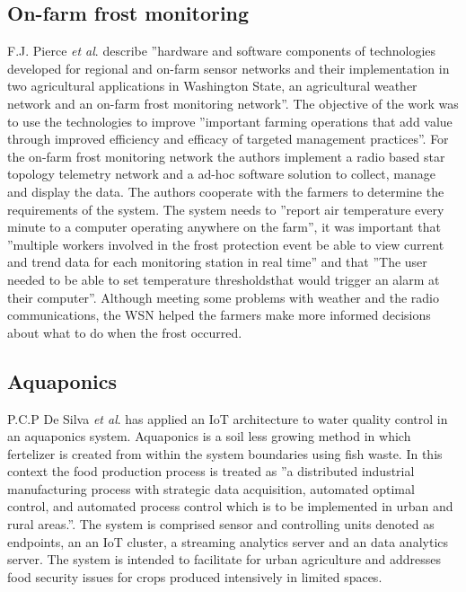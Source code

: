 \documentclass[]{uiophd}
\begin{document}
\subsection{On-farm frost monitoring}
F.J. Pierce \textit{et al}. \parencite{PIERCE200832} describe ''hardware and software components of technologies developed for regional and on-farm sensor networks and their implementation in two agricultural applications in Washington State, an agricultural weather network and an on-farm frost monitoring network''. The objective of the work was to use the technologies to improve ''important farming operations that add value through improved efficiency and efficacy of targeted management practices''\parencite{PIERCE200832}. For the on-farm frost monitoring network the authors implement a radio based star topology telemetry network and a ad-hoc software solution to collect, manage and display the data. The authors cooperate with the farmers to determine the requirements of the system. The system needs to ''report air temperature every minute to a computer operating anywhere on the farm''\parencite{PIERCE200832}, it was important that ''multiple workers involved in the frost protection event be able to view current and trend data for each monitoring station in real time''\parencite{PIERCE200832} and that ''The user needed to be able to set temperature thresholdsthat would trigger an alarm at their computer''\parencite{PIERCE200832}. Although meeting some problems with weather and the radio communications, the WSN helped the farmers make more informed decisions about what to do when the frost occurred. 

\subsection{Aquaponics}
P.C.P De Silva \textit{et al}. \parencite{7780266} has applied an IoT architecture to water quality control in an aquaponics system. Aquaponics is a soil less growing method in which fertelizer is created from within the system boundaries using fish waste. In this context the food production process is treated as ''a distributed industrial manufacturing process with strategic data acquisition, automated optimal control, and automated process control which is to be implemented in urban and rural areas.''\parencite{77802661}. The system is comprised sensor and controlling units denoted as endpoints, an an IoT cluster, a  streaming analytics server and an data analytics server. The system is intended to facilitate for urban agriculture and addresses food security issues for crops produced intensively in limited spaces.  
\end{document}
